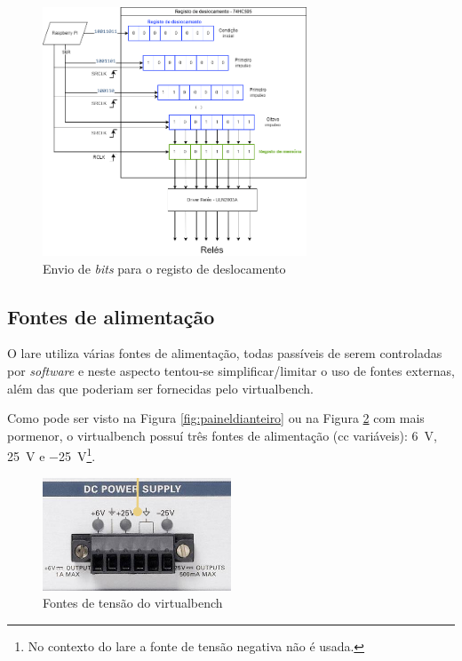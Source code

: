 \begin{figure}[hbtp]
	\centering
	\includegraphics[width=0.7\textwidth]{figures/registo deslocamente.drawio.png}
	\caption{Envio de \textit{bits} para o registo de deslocamento}
	\label{fig:esquematico74hc595}
\end{figure}

\subsection{Fontes de alimentação}
\label{sec:fontesalimentacao}
O \acrshort{lare} utiliza várias fontes de alimentação, todas passíveis de serem controladas por \textit{software} e neste aspecto tentou-se simplificar/limitar o uso de fontes externas, além das que poderiam ser fornecidas pelo \acrshort{virtualbench}. 

Como pode ser visto na Figura \ref{fig:paineldianteiro} ou na Figura \ref{fig:promenorfontes} com mais pormenor, o \acrshort{virtualbench} possuí três fontes de alimentação (\acrshort{cc} variáveis): \SI{+6}{\volt}, \SI{+25}{\volt} e \SI{-25}{\volt}\footnote{No contexto do \acrshort{lare} a fonte de tensão negativa não é usada.}.

\begin{figure}[hbtp]
	\centering
	\includegraphics[width=0.5\textwidth]{figures/fontes_VB.png}
	\caption{Fontes de tensão do \acrshort{virtualbench}}
	\label{fig:promenorfontes}
\end{figure}

